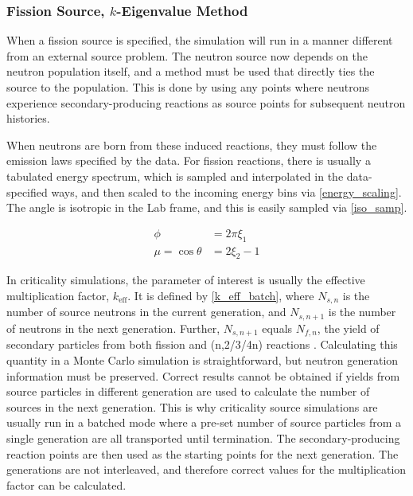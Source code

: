 
\subsubsection{Fission Source, $k$-Eigenvalue Method}

When a fission source is specified, the simulation will run in a manner different from an external source problem.  The neutron source now depends on the neutron population itself, and a method must be used that directly ties the source to the population.  This is done by using any points where neutrons experience secondary-producing reactions as source points for subsequent neutron histories.  

When neutrons are born from these induced reactions, they must follow the emission laws specified by the data.  For fission reactions, there is usually a tabulated energy spectrum, which is sampled and interpolated in the data-specified ways, and then scaled to the incoming energy bins via \eqref{energy_scaling}.  The angle is isotropic in the Lab frame, and this is easily sampled via \eqref{iso_samp}.

\begin{equation}
\label{iso_samp}
\begin{split}
\phi &= 2 \pi \xi_1 \\
\mu= \cos \theta &= 2 \xi_2 -1
\end{split}
\end{equation}

In criticality simulations, the parameter of interest is usually the effective multiplication factor, $k_\mathrm{eff}$.  It is defined by \eqref{k_eff_batch}, where $N_{s,n}$ is the number of source neutrons in the current generation, and $N_{s,n+1}$ is the number of neutrons in the next generation. Further, $N_{s,n+1}$ equals $N_{f,n}$, the yield of secondary particles from both fission and (n,2/3/4n) reactions \cite{jaakko}.  Calculating this quantity in a Monte Carlo simulation is straightforward, but neutron generation information must be preserved.  Correct results cannot be obtained if yields from source particles in different generation are used to calculate the number of sources in the next generation.  This is why criticality source simulations are usually run in a batched mode where a pre-set number of source particles from a single generation are all transported until termination.  The secondary-producing reaction points are then used as the starting points for the next generation.  The generations are not interleaved, and therefore correct values for the multiplication factor can be calculated.

